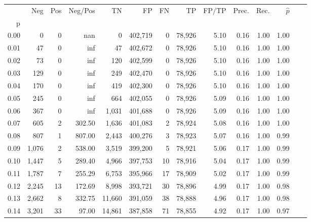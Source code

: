 \begin{tabular}{rrrrrrrrrrrrrr}
\toprule
{} &     Neg &    Pos & Neg/Pos &       TN &       FP &      FN &      TP & FP/TP & Prec. &  Rec. & $\hat{p}$ \\
p    &         &        &         &          &          &         &         &       &       &       &           \\
\midrule
0.00 &       0 &      0 &     nan &        0 &  402,719 &       0 &  78,926 &  5.10 &  0.16 &  1.00 &      1.00 \\
0.01 &      47 &      0 &     inf &       47 &  402,672 &       0 &  78,926 &  5.10 &  0.16 &  1.00 &      1.00 \\
0.02 &      73 &      0 &     inf &      120 &  402,599 &       0 &  78,926 &  5.10 &  0.16 &  1.00 &      1.00 \\
0.03 &     129 &      0 &     inf &      249 &  402,470 &       0 &  78,926 &  5.10 &  0.16 &  1.00 &      1.00 \\
0.04 &     170 &      0 &     inf &      419 &  402,300 &       0 &  78,926 &  5.10 &  0.16 &  1.00 &      1.00 \\
0.05 &     245 &      0 &     inf &      664 &  402,055 &       0 &  78,926 &  5.09 &  0.16 &  1.00 &      1.00 \\
0.06 &     367 &      0 &     inf &    1,031 &  401,688 &       0 &  78,926 &  5.09 &  0.16 &  1.00 &      1.00 \\
0.07 &     605 &      2 &  302.50 &    1,636 &  401,083 &       2 &  78,924 &  5.08 &  0.16 &  1.00 &      1.00 \\
0.08 &     807 &      1 &  807.00 &    2,443 &  400,276 &       3 &  78,923 &  5.07 &  0.16 &  1.00 &      0.99 \\
0.09 &   1,076 &      2 &  538.00 &    3,519 &  399,200 &       5 &  78,921 &  5.06 &  0.17 &  1.00 &      0.99 \\
0.10 &   1,447 &      5 &  289.40 &    4,966 &  397,753 &      10 &  78,916 &  5.04 &  0.17 &  1.00 &      0.99 \\
0.11 &   1,787 &      7 &  255.29 &    6,753 &  395,966 &      17 &  78,909 &  5.02 &  0.17 &  1.00 &      0.99 \\
0.12 &   2,245 &     13 &  172.69 &    8,998 &  393,721 &      30 &  78,896 &  4.99 &  0.17 &  1.00 &      0.98 \\
0.13 &   2,662 &      8 &  332.75 &   11,660 &  391,059 &      38 &  78,888 &  4.96 &  0.17 &  1.00 &      0.98 \\
0.14 &   3,201 &     33 &   97.00 &   14,861 &  387,858 &      71 &  78,855 &  4.92 &  0.17 &  1.00 &      0.97 \\

\end{tabular}
